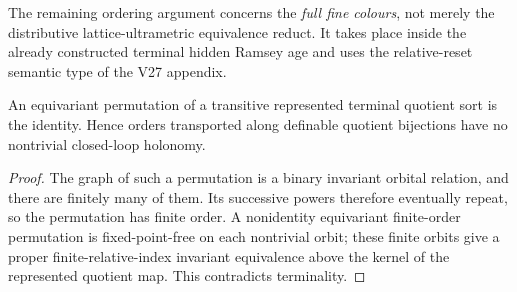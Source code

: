 The remaining ordering argument concerns the \emph{full fine
colours}, not merely the distributive lattice-ultrametric
equivalence reduct. It takes place inside the already
constructed terminal hidden Ramsey age and uses the
relative-reset semantic type of the V27 appendix.

\begin{lemma}
\label{lem:ep-terminal-holonomy}
An equivariant permutation of a transitive represented
terminal quotient sort is the identity. Hence orders
transported along definable quotient bijections have
no nontrivial closed-loop holonomy.
\end{lemma}
\begin{proof}
The graph of such a permutation is a binary invariant
orbital relation, and there are finitely many of them.
Its successive powers therefore eventually repeat,
so the permutation has finite order. A nonidentity
equivariant finite-order permutation is fixed-point-free
on each nontrivial orbit; these finite orbits give
a proper finite-relative-index invariant equivalence
above the kernel of the represented quotient map.
This contradicts terminality.
\end{proof}

